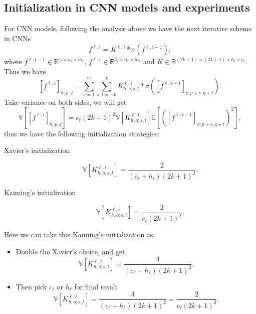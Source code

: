 \subsection{Initialization in CNN models and experiments}
For CNN models, following the analysis above we have the next iterative scheme in CNNs
\begin{equation}\label{key}
f^{\ell,i} = K^{\ell,i} \ast \sigma (f^{\ell,i-1}),
\end{equation}
where $f^{\ell,i-1} \in \mathbb{R}^{c_\ell\times n_\ell \times m_\ell }$, $f^{\ell,i} \in \mathbb{R}^{h_\ell\times n_\ell \times m_\ell}$ and $K \in \mathbb{R}^{(2k+1) \times (2k+1) \times h_\ell \times c_\ell}$.
Thus we have
\begin{equation}\label{key}
[f^{\ell,i}]_{h;p,q} = \sum_{c=1}^{c_\ell}\sum_{s,t=-k}^k K^{\ell,i}_{h,c;s,t} \ast \sigma ([f^{\ell,i-1}]_{c;p+s,q+t}).
\end{equation}
Take variance on both sides, we will get
\begin{equation}\label{key}
\mathbb{V} [[f^{\ell,i}]_{h;p,q}] = c_\ell (2k+1)^2 \mathbb{V}[K^{\ell,i}_{h,o;s,t}] \mathbb{E}[([f^{\ell,i-1}]_{o;p+s,q+t})^2],
\end{equation}
thus we have the following initialization strategies:
\begin{description}
	\item[Xavier's initialization] 
	\begin{equation}\label{key}
	\mathbb{V}[K^{\ell,i}_{h,o;s,t}] = \frac{2}{ (c_\ell + h_\ell) (2k+1)^2}.
	\end{equation}
	\item[Kaiming's initialization]
	\begin{equation}\label{key}
	\mathbb{V}[K^{\ell,i}_{h,o;s,t}] = \frac{2}{c_\ell (2k+1)^2}.
	\end{equation}
\end{description}

Here we can take this Kaiming's initialization as:
\begin{itemize}
	\item Double the Xavier's choice, and get
	\begin{equation}\label{key}
	\mathbb{V}[K^{\ell,i}_{h,o;s,t}] = \frac{4}{(c_\ell + h_\ell )(2k+1)^2}.
	\end{equation}
	\item Then pick $c_\ell$ or $h_\ell$ for final result
	\begin{equation}\label{key}
	\mathbb{V}[K^{\ell,i}_{h,o;s,t}] = \frac{4}{(c_\ell + h_\ell )(2k+1)^2} = \frac{2}{c_\ell (2k+1)^2}.
	\end{equation}
\end{itemize}

